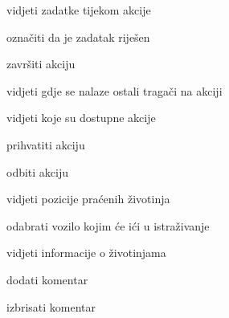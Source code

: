 \begin{packed_enum}
\begin{packed_enum}
					\item vidjeti zadatke tijekom akcije
					 \begin{packed_enum}
						\item označiti da je zadatak riješen
					\end{packed_enum}
					\item završiti akciju
					\item vidjeti gdje se nalaze ostali tragači na akciji 
					\item vidjeti koje su dostupne akcije 
					 \begin{packed_enum}
						\item prihvatiti akciju
						\item odbiti akciju
					\end{packed_enum} 
					\item vidjeti pozicije praćenih životinja
					\item odabrati vozilo kojim će ići u istraživanje
					\item vidjeti informacije o životinjama
					 \begin{packed_enum}
						\item dodati komentar
						\item izbrisati komentar
					\end{packed_enum}

					
				\end{packed_enum}

				\item  {}
				
				\begin{packed_enum}


\end{packed_enum}
\end{packed_enum}
